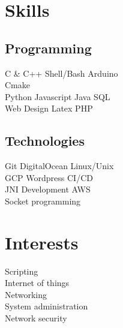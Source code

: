 \documentclass[]{deedy-resume-openfont}
\begin{document}
\begin{minipage}[t][18cm]{0.33\textwidth}


\section{Skills}
\subsection{Programming}
C \& C++ \textbullet{}   Shell/Bash \textbullet{} Arduino \\
Cmake\\
Python \textbullet{} Javascript \textbullet{} Java \textbullet{} SQL\\ 
Web Design \textbullet{} Latex \textbullet{} PHP
\sectionsep
\subsection{Technologies}
Git \textbullet{} DigitalOcean \textbullet{} Linux/Unix\\
GCP \textbullet{} Wordpress \textbullet{} CI/CD\\
JNI Development \textbullet{} AWS\\
Socket programming
\sectionsep

\section{Interests}
\textbullet{} Scripting\\
\textbullet{} Internet of things \\
\textbullet{} Networking \\
\textbullet{} System administration \\
\textbullet{} Network security
\sectionsep


\end{minipage}
\end{document}
